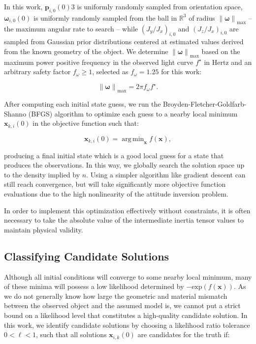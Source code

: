 \documentclass[a4paper,twocolumn]{spaceDebrisC} %
\newcommand{\vctr}[1]{\bm{#1}}
\newcommand{\norm}[1]{\left\lVert#1\right\rVert}
\DeclareMathOperator*{\argmin}{arg\,min}
\begin{document}
\noindent
In this work, $\vctr{p}_{i,0}(0)3$ is uniformly randomly sampled from orientation space, $\vctr{\omega}_{i,0}(0)$ is uniformly randomly sampled from the ball in $\mathbb{R}^3$ of radius $\norm{\vctr{\omega}}_\text{max}$ -- the maximum angular rate to search -- while $\left(J_y / J_x\right)_{i,0}$ and $\left(J_z / J_x\right)_{i,0}$ are sampled from Gaussian prior distributions centered at estimated values derived from the known geometry of the object. We determine $\norm{\vctr{\omega}}_\text{max}$ based on the maximum power positive frequency in the observed light curve $f^\star$ in Hertz and an arbitrary safety factor $f_\omega \geq 1$, selected as $f_\omega = 1.25$ for this work:

\begin{equation} \label{eq:ang_vel_max}
  \norm{\vctr{\omega}}_\text{max} = 2\pi f_\omega f^\star.
\end{equation}

After computing each initial state guess, we run the Broyden-Fletcher-Goldfarb-Shanno (BFGS) algorithm \cite{broyden1970, fletcher1970, goldfarb1970, shanno1970} to optimize each guess to a nearby local minimum $\vctr{x}_{k,i}(0)$ in the objective function such that:

\begin{equation} \label{eq:opt_problem}
 \vctr{x}_{k,i}(0) = \argmin_{\vctr{x}} f(\vctr{x}),
\end{equation}

\noindent
producing a final initial state which is a good local guess for a state that produces the observations. In this way, we globally search the solution space up to the density implied by $n$. Using a simpler algorithm like gradient descent can still reach convergence, but will take significantly more objective function evaluations due to the high nonlinearity of the attitude inversion problem.

In order to implement this optimization effectively without constraints, it is often necessary to take the absolute value of the intermediate inertia tensor values to maintain physical validity. 

\subsection{Classifying Candidate Solutions} \label{sec:candidate_sols}

Although all initial conditions will converge to some nearby local minimum, many of these minima will possess a low likelihood determined by $-\mathrm{exp}(f(\vctr{x}))$. As we do not generally know how large the geometric and material mismatch between the observed object and the assumed model is, we cannot put a strict bound on a likelihood level that constitutes a high-quality candidate solution. In this work, we identify candidate solutions by choosing a likelihood ratio tolerance $0 < \ell < 1$, such that all solutions $\vctr{x}_{i,k}(0)$ are candidates for the truth if:
\end{document}
